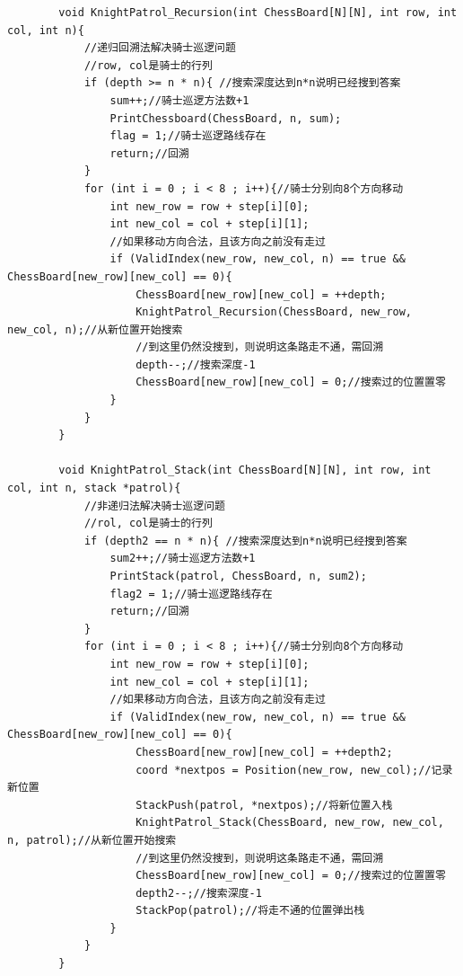 \documentclass[10pt,a4paper]{article}
\begin{document}
\begin{verbatim}
		void KnightPatrol_Recursion(int ChessBoard[N][N], int row, int col, int n){
			//递归回溯法解决骑士巡逻问题
			//row, col是骑士的行列
			if (depth >= n * n){ //搜索深度达到n*n说明已经搜到答案
				sum++;//骑士巡逻方法数+1
				PrintChessboard(ChessBoard, n, sum);
				flag = 1;//骑士巡逻路线存在
				return;//回溯
			}
			for (int i = 0 ; i < 8 ; i++){//骑士分别向8个方向移动
				int new_row = row + step[i][0];
				int new_col = col + step[i][1];
				//如果移动方向合法，且该方向之前没有走过
				if (ValidIndex(new_row, new_col, n) == true && ChessBoard[new_row][new_col] == 0){
					ChessBoard[new_row][new_col] = ++depth;
					KnightPatrol_Recursion(ChessBoard, new_row, new_col, n);//从新位置开始搜索
					//到这里仍然没搜到，则说明这条路走不通，需回溯
					depth--;//搜索深度-1
					ChessBoard[new_row][new_col] = 0;//搜索过的位置置零
				}
			}
		}

		void KnightPatrol_Stack(int ChessBoard[N][N], int row, int col, int n, stack *patrol){
			//非递归法解决骑士巡逻问题
			//rol, col是骑士的行列
			if (depth2 == n * n){ //搜索深度达到n*n说明已经搜到答案
				sum2++;//骑士巡逻方法数+1
				PrintStack(patrol, ChessBoard, n, sum2);
				flag2 = 1;//骑士巡逻路线存在
				return;//回溯
			}
			for (int i = 0 ; i < 8 ; i++){//骑士分别向8个方向移动
				int new_row = row + step[i][0];
				int new_col = col + step[i][1];
				//如果移动方向合法，且该方向之前没有走过
				if (ValidIndex(new_row, new_col, n) == true && ChessBoard[new_row][new_col] == 0){
					ChessBoard[new_row][new_col] = ++depth2;
					coord *nextpos = Position(new_row, new_col);//记录新位置
					StackPush(patrol, *nextpos);//将新位置入栈
					KnightPatrol_Stack(ChessBoard, new_row, new_col, n, patrol);//从新位置开始搜索
					//到这里仍然没搜到，则说明这条路走不通，需回溯
					ChessBoard[new_row][new_col] = 0;//搜索过的位置置零
					depth2--;//搜索深度-1
					StackPop(patrol);//将走不通的位置弹出栈
				}
			}
		}
	\end{verbatim}
\end{document}
